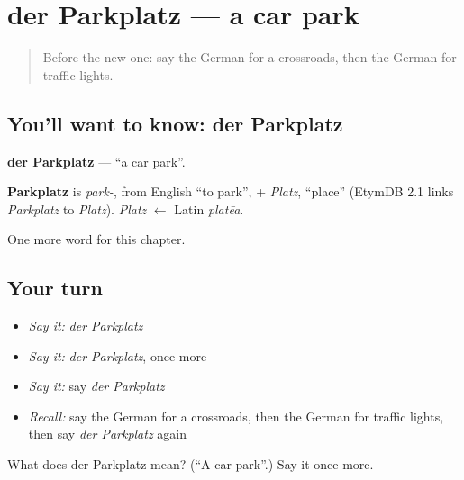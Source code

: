 \section[der Parkplatz]{der Parkplatz — a car park}

\label{lesson:GE-C107-parkplatz}



\begin{quote}
Before the new one: say the German for a crossroads, then the German for traffic lights.
\end{quote}

\subsection*{You'll want to know: der Parkplatz}
\textbf{der Parkplatz} — \textquotedblleft{}a car park\textquotedblright{}.

\begin{cousinweb}
\textbf{Parkplatz} is \emph{park-}, from English \textquotedblleft{}to park\textquotedblright{}, + \emph{Platz}, \textquotedblleft{}place\textquotedblright{} (EtymDB 2.1 links \emph{Parkplatz} to \emph{Platz}). \emph{Platz} $\leftarrow$ Latin \emph{platēa}.
\end{cousinweb}

\begin{grammarlens}[title={What you've built}]
One more word for this chapter.
\end{grammarlens}

\subsection*{Your turn}
\begin{itemize}
\raggedright
  \item \emph{Say it:} \emph{der Parkplatz}
  \item \emph{Say it:} \emph{der Parkplatz}, once more
  \item \emph{Say it:} say \emph{der Parkplatz}
  \item \emph{Recall:} say the German for a crossroads, then the German for traffic lights, then say \emph{der Parkplatz} again
\end{itemize}

\begin{tcolorbox}[breakable,colback=teal!4,colframe=teal!35!black,title={Before you move on}]
What does der Parkplatz mean? (\textquotedblleft{}A car park\textquotedblright{}.) Say it once more.
\end{tcolorbox}
